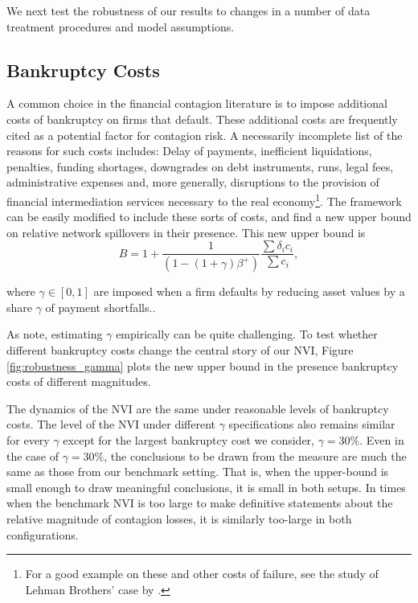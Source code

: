 We next test the robustness of our results to changes in a number of data treatment procedures and model assumptions.

\subsection{Bankruptcy Costs}

A common choice in the financial contagion literature is to impose additional costs of bankruptcy on firms that default. These additional costs are frequently cited as a potential factor for contagion risk. A necessarily incomplete list of the reasons for such costs includes: Delay of payments, inefficient liquidations, penalties, funding shortages, downgrades on debt instruments, runs, legal fees, administrative expenses and, more generally, disruptions to the provision of financial intermediation services necessary to the real economy\footnote{For a good example on these and other costs of failure, see the study of Lehman Brothers' case by \citet{fleming2014failure}.}. The \citet{eisenberg2001systemic} framework can be easily modified to include these sorts of costs, and \citet{glasserman2015likely} find a new upper bound on relative network spillovers in their presence. This new upper bound is
\begin{equation}
B=1+\frac{1}{(1-\left( 1+\gamma \right) \beta ^{+})}\frac{\sum {\delta
_{i}c_{i}}}{\sum {c_{i}}},
\end{equation}

\noindent where $\gamma \in [0, 1]$ are imposed when a firm defaults by reducing asset values by a share $\gamma$ of payment shortfalls.. 

As \citet{glassermanSurvey2016} note, estimating $\gamma$ empirically can be quite challenging. To test whether different bankruptcy costs change the central story of our NVI, Figure \ref{fig:robustness_gamma} plots the new upper bound in the presence bankruptcy costs of different magnitudes.

The dynamics of the NVI are the same under reasonable levels of bankruptcy costs. The level of the NVI under different $\gamma$ specifications also remains similar for every $\gamma$ except for the largest bankruptcy cost we consider, $\gamma=30\%$. Even in the case of $\gamma=30\%$, the conclusions to be drawn from the measure are much the same as those from our benchmark setting. That is, when the upper-bound is small enough to draw meaningful conclusions, it is small in both setups. In times when the benchmark NVI is too large to make definitive statements about the relative magnitude of contagion losses, it is similarly too-large in both configurations. 

